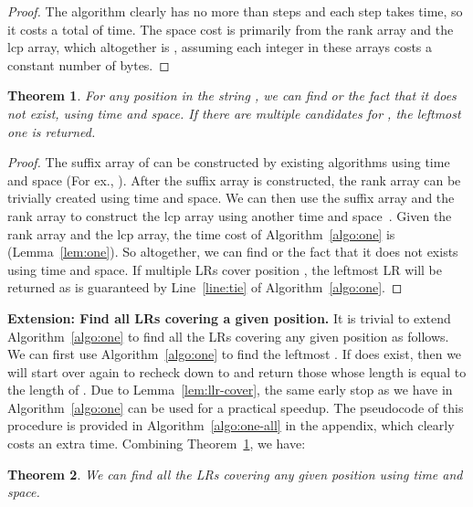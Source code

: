 \documentclass[preprint]{elsarticle}
\newtheorem{theorem}{Theorem}[section]
\begin{document}
 \begin{proof}
   The algorithm clearly has no more than  steps and each step
   takes  time, so it costs a total of  time. The space cost is primarily
  from the rank array and the lcp array, which altogether is ,
   assuming each integer in these arrays costs a constant number of
   bytes.  

 \end{proof}

\begin{theorem}
\label{thm:one}
For any position  in the string , we can find  or the
fact that it does not exist, using
 time and  space.  If there are multiple candidates for
, the leftmost one is returned.
\end{theorem}

\begin{proof}
  The suffix array of  can be constructed by existing algorithms
  using  time and space (For ex., \cite{KA-SA2005}). After the
  suffix array is constructed, the rank array can be trivially created
  using  time and space.  We can then use the suffix array and
  the rank array to construct the lcp array using another  time
  and space~\cite{KLAAP01}.  Given the rank array and the lcp array,
  the time cost of Algorithm~\ref{algo:one} is 
  (Lemma~\ref{lem:one}). So altogether, we can find  or the
  fact that it does not exists using  time and space.
If multiple LRs cover position , the leftmost LR will be returned
  as is guaranteed by Line~\ref{line:tie} of
  Algorithm~\ref{algo:one}. 
\end{proof}



\smallskip 
\noindent
{\bf Extension: Find all LRs covering a given position.} 
It is trivial to extend Algorithm~\ref{algo:one} to find all the LRs
covering any given position  as follows. We can first use
Algorithm~\ref{algo:one} to find the leftmost . If  does
exist, then we will start over again to recheck  down to
 and return those whose length is equal to the length of
. Due to Lemma~\ref{lem:llr-cover}, the same early stop as we
have in Algorithm~\ref{algo:one} can be used for a practical
speedup. 
The pseudocode of this
procedure is provided in Algorithm~\ref{algo:one-all} in the appendix, which 
clearly costs an extra  time. Combining
Theorem~\ref{thm:one}, we have:



\begin{theorem}
\label{thm:one-all}
We can find all the LRs covering any given position  using  time
and space.
\end{theorem}
\end{document}
